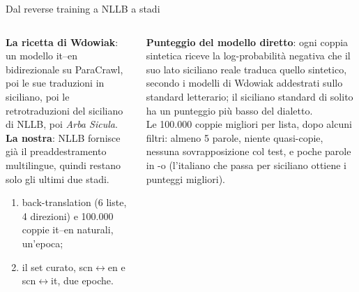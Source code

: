 \documentclass[aspectratio=169]{beamer}
\newcommand{\T}[2]{#2}
\newcommand{\T}[2]{#1}
\begin{document}
\begin{frame}{\T{From reverse training to a staged NLLB}{Dal reverse training a NLLB a stadi}}
  \begin{columns}[t]
    \begin{column}{0.5\textwidth}
      \footnotesize
      \textbf{\T{Wdowiak's recipe}{La ricetta di Wdowiak}}: \T{a bidirectional it--en model on
      ParaCrawl, then Sicilian forward-translations of it, then back-translations of NLLB's
      Sicilian, then \emph{Arba Sicula}.}%
      {un modello it--en bidirezionale su ParaCrawl, poi le sue traduzioni in siciliano, poi le
      retrotraduzioni del siciliano di NLLB, poi \emph{Arba Sicula}.}\\[1mm]
      \textbf{\T{Ours}{La nostra}}: \T{NLLB already provides the multilingual pretraining, so
      only the last two stages remain.}%
      {NLLB fornisce gi\`a il preaddestramento multilingue, quindi restano solo gli ultimi
      due stadi.}
      \begin{enumerate}
        \item \T{back-translations (6 lists, 4 directions) and 100,000 natural it--en pairs,
              one epoch;}%
              {back-translation (6 liste, 4 direzioni) e 100.000 coppie it--en naturali, un'epoca;}
        \item \T{the curated set, scn$\leftrightarrow$en and scn$\leftrightarrow$it, two epochs.}%
              {il set curato, scn$\leftrightarrow$en e scn$\leftrightarrow$it, due epoche.}
      \end{enumerate}
    \end{column}
    \begin{column}{0.5\textwidth}
      \footnotesize
      \textbf{\T{Forward scoring}{Punteggio del modello diretto}}: \T{each synthetic pair is scored by
      the negative log-probability that its real Sicilian side translates the synthetic one,
      under Wdowiak's models trained on the literary standard; standard Sicilian usually
      scores lower than dialect.}%
      {ogni coppia sintetica riceve la log-probabilit\`a negativa che il suo lato siciliano
      reale traduca quello sintetico, secondo i modelli di Wdowiak addestrati sullo standard
      letterario; il siciliano standard di solito ha un punteggio pi\`u basso del dialetto.}\\[1mm]
      \T{The best 100,000 pairs per list, after filters: at least 5 words, no near-copies, no
      test overlap, and few words in -o (Italian passing as Sicilian obtains the best
      scores).}%
      {Le 100.000 coppie migliori per lista, dopo alcuni filtri: almeno 5 parole, niente
      quasi-copie, nessuna sovrapposizione col test, e poche parole in -o (l'italiano che
      passa per siciliano ottiene i punteggi migliori).}
    \end{column}
  \end{columns}
\end{frame}
\end{document}
